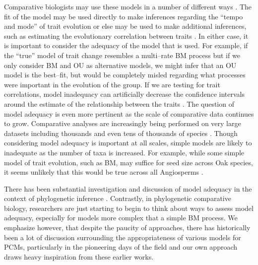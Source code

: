 \documentclass[a4paper,12pt]{article}
\begin{document}
Comparative biologists may use these models in a number of different ways \citep{Freckleton2011, PennellHarmon}. The fit of the model may be used directly to make inferences regarding the ``tempo and mode'' of trait evolution \citep{HansenMartins1996, Mooers1999, Harmon2010} or else may be used to make additional inferences, such as estimating the evolutionary correlation between traits \citep{Felsenstein1985}. In either case, it is important to consider the adequacy of the model that is used. For example, if the ``true'' model of trait change resembles a multi--rate BM process \citep{Omeara2006, Thomas2006, Eastman2011} but if we only consider BM and OU as alternative models, we might infer that an OU model is the best--fit, but would be completely misled regarding what processes were important in the evolution of the group. If we are testing for trait correlations, model inadequacy can artificially decrease the confidence intervals around the estimate of the relationship between the traits \citep{Rohlf2006}. The question of model adequacy is even more pertinent as the scale of comparative data continues to grow. Comparative analyses are increasingly being performed on very large datasets including thousands and even tens of thousands of species \citep[e.g.][]{Coopermammal, Venditti2011, Jetz2012, Rabosky2013}. Though considering model adequacy is important at all scales, simple models are likely to inadequate as the number of taxa is increased. For example, while some simple  model of trait evolution, such as BM, may suffice for seed size across Oak species, it seems unlikely that this would be true across all Angiosperms \citep{Moles2005}.

There has been substantial investigation and discussion of model adequacy in the context of phylogenetic inference \citep[e.g.][]{SullivanSwofford, Goldman, SandersonKim, Bollback2002, Ripplinger2010, Lewis2013, Reid2013}. Contrastly, in phylogenetic comparative biology, researchers are just starting to begin to think about ways to assess model adequacy, especially for models more complex that a simple BM process. We emphasize however, that despite the paucity of approaches, there has historically been a lot of discussion surrounding the appropriateness of various models for PCMs, particularly in the pioneering days of the field \citep[e.g.][]{Felsenstein1985, Felsenstein1988, HarveyPagel1991, Garland1992, Pagel1993, Diaz1996, Price1997, Garland1999, GarlandIves2000, HansenOrzack2005, Hansen2012} and our own approach draws heavy inspiration from these earlier works.
\end{document}
